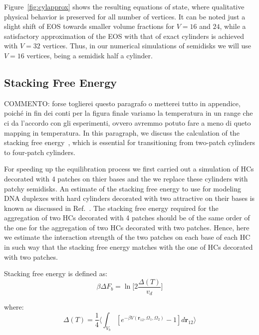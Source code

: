 \documentclass[aip,jcp, amsmath, amssymb, reprint]{revtex4-1}
\begin{document}
Figure~\ref{fig:cylapprox} shows the resulting equations of state, where qualitative physical behavior is preserved for
all number of vertices. It can be noted just a slight shift of EOS towards smaller volume fractions for $V= 16$ and $24$,
while a satisfactory approximation of the EOS with that of exact cylinders is achieved with $V=32$ vertices. 
Thus, in our numerical simulations of semidisks we will use $V=16$ vertices, being a semidisk half a cylinder. 

\subsection{Stacking Free Energy}

{\color{red} COMMENTO: forse toglierei questo paragrafo o metterei tutto in appendice, poiché in fin dei conti 
  per la figura finale variamo la temperatura in un range che ci da l'accordo con gli esperimenti, ovvero
avremmo potuto fare a meno di queto mapping in temperatura.}
In this paragraph, we discuss the calculation of the stacking free energy~\cite{DeMichele12}, which is essential for
transitioning from two-patch cylinders to four-patch cylinders. 

For speeding up the equilibration process we first carried out a simulation of HCs decorated with 4 patches on thier bases and the we replace
these cylinders with patchy semidisks. An estimate of the stacking free energy to use for modeling DNA duplexes with hard cylinders 
decorated with two attractive on their bases is known as discussed in Ref.~\cite{DeMichele12}. The stacking free energy required for the
aggregation of two HCs decorated with 4 patches should be of the same order of the one for the aggregation of two HCs decorated with two patches.
Hence, here we estimate the interaction strength of the two patches on each base of each HC in such way that the stacking free energy matches with
the one of HCs decorated with two patches.

Stacking free energy is defined as:
\begin{equation}
	\beta\Delta F_b=\ln \bigg[2\frac{\Delta(T)}{v_d}\bigg]
	\label{deltaf}
\end{equation}

where:
\begin{equation}
\label{deltat}
	\Delta(T)=\frac{1}{4}\bigg\langle \int_{V_b} [e^{-\beta V(\textbf{r}_{12}, \Omega_1, \Omega_2)}-1]d\textbf{r}_{12}\bigg\rangle
\end{equation}
\end{document}

